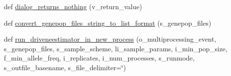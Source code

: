 \begin{DoxyCompactItemize}
\item 
def \hyperlink{namespacenegui_1_1pgutilities_aa839d4997d2bd2c15016c33cc7fce3b0}{dialog\+\_\+returns\+\_\+nothing} (v\+\_\+return\+\_\+value)
\item 
def \hyperlink{namespacenegui_1_1pgutilities_aed0f15b22462914445ffe1ec2a77cbc8}{convert\+\_\+genepop\+\_\+files\+\_\+string\+\_\+to\+\_\+list\+\_\+format} (s\+\_\+genepop\+\_\+files)
\item 
def \hyperlink{namespacenegui_1_1pgutilities_abce749cfc8159cf9aed491a8a1c8dbe3}{run\+\_\+driveneestimator\+\_\+in\+\_\+new\+\_\+process} (o\+\_\+multiprocessing\+\_\+event, s\+\_\+genepop\+\_\+files, s\+\_\+sample\+\_\+scheme, li\+\_\+sample\+\_\+params, i\+\_\+min\+\_\+pop\+\_\+size, f\+\_\+min\+\_\+allele\+\_\+freq, i\+\_\+replicates, i\+\_\+num\+\_\+processes, s\+\_\+runmode, s\+\_\+outfile\+\_\+basename, s\+\_\+file\+\_\+delimiter=\char`\"{})
\end{DoxyCompactItemize}
